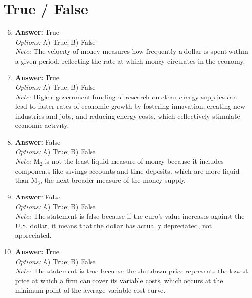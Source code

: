 \documentclass[12pt]{article}
\begin{document}
\section*{True / False}
\begin{enumerate}[label=\arabic*.]
\setcounter{enumi}{5}
\item \textbf{Answer:} True
\\ \textit{Options:} A) True; B) False
\\ \textit{Note:} The velocity of money measures how frequently a dollar is spent within a given period, reflecting the rate at which money circulates in the economy.
\item \textbf{Answer:} True
\\ \textit{Options:} A) True; B) False
\\ \textit{Note:} Higher government funding of research on clean energy supplies can lead to faster rates of economic growth by fostering innovation, creating new industries and jobs, and reducing energy costs, which collectively stimulate economic activity.
\item \textbf{Answer:} False
\\ \textit{Options:} A) True; B) False
\\ \textit{Note:} M$_{2}$ is not the least liquid measure of money because it includes components like savings accounts and time deposits, which are more liquid than M$_{3}$, the next broader measure of the money supply.
\item \textbf{Answer:} False
\\ \textit{Options:} A) True; B) False
\\ \textit{Note:} The statement is false because if the euro's value increases against the U.S. dollar, it means that the dollar has actually depreciated, not appreciated.
\item \textbf{Answer:} True
\\ \textit{Options:} A) True; B) False
\\ \textit{Note:} The statement is true because the shutdown price represents the lowest price at which a firm can cover its variable costs, which occurs at the minimum point of the average variable cost curve.
\end{enumerate}
\end{document}
